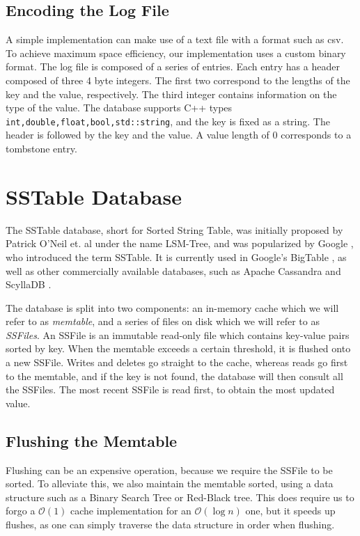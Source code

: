 \documentclass[10pt]{extarticle}
\begin{document}
\subsection{Encoding the Log File}

A simple implementation can make use of a text file with a format such as csv. To achieve maximum space efficiency, our implementation uses a custom binary format. The log file is composed of a series of entries. Each entry has a header composed of three 4 byte integers. The first two correspond to the lengths of the key and the value, respectively. The third integer contains information on the type of the value. The database supports C++ types \lstinline{int,double,float,bool,std::string}, and the key is fixed as a string. The header is followed by the key and the value. A value length of 0 corresponds to a tombstone entry. 

\newpage

\section{SSTable Database}

The SSTable database, short for Sorted String Table, was initially proposed by Patrick O’Neil et. al under the name LSM-Tree, and was popularized by Google \cite{bigtable}, who introduced the term SSTable. It is currently used in Google's BigTable \cite{BigTableURl}, as well as other commercially available databases, such as Apache Cassandra \cite{Cassandra} and ScyllaDB \cite{ScyllaDB}. 

The database is split into two components: an in-memory cache which we will refer to as \textit{memtable}, and a series of files on disk which we will refer to as \textit{SSFiles}. An SSFile is an immutable read-only file which contains key-value pairs sorted by key. When the memtable exceeds a certain threshold, it is flushed onto a new SSFile. Writes and deletes go straight to the cache, whereas reads go first to the memtable, and if the key is not found, the database will then consult all the SSFiles. The most recent SSFile is read first, to obtain the most updated value.

\subsection{Flushing the Memtable}

Flushing can be an expensive operation, because we require the SSFile to be sorted. To alleviate this, we also maintain the memtable sorted, using a data structure such as a Binary Search Tree or Red-Black tree. This does require us to forgo a $\mathcal{O}(1)$ cache implementation for an $\mathcal{O}(\log n)$ one, but it speeds up flushes, as one can simply traverse the data structure in order when flushing.
\end{document}
